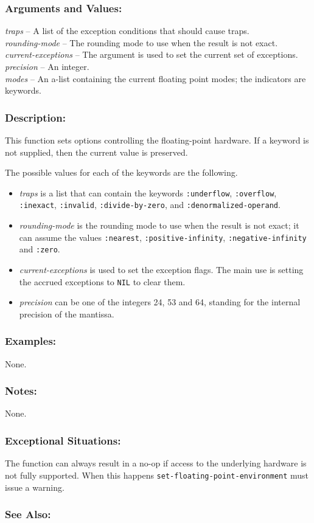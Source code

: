 \documentclass[10pt,fleqn]{article}
\newcommand{\code}[1]{\texttt{#1}}
\newcommand{\varname}[1]{\textit{#1}}
\newcommand{\DArgsNValues}{\subsubsection*{Arguments and Values:}}
\newcommand{\DDescription}{\subsubsection*{Description:}}
\newcommand{\DExamples}{\subsubsection*{Examples:}}
\newcommand{\DExceptional}{\subsubsection*{Exceptional Situations:}}
\newcommand{\DNotes}{\subsubsection*{Notes:}}
\newcommand{\DSeeAlso}{\subsubsection*{See Also:}}
\begin{document}
\DArgsNValues{}

\varname{traps} -- A list of the exception conditions that should cause
traps.\\
\varname{rounding-mode} -- The rounding mode to use when the result is
not exact.\\
\varname{current-exceptions} -- The argument is used to set the current
set of exceptions.\\
\varname{precision} -- An integer.\\
\varname{modes} -- An a-list containing the current floating
point modes; the indicators are keywords.

\DDescription{}

This function sets options controlling the floating-point
hardware. If a keyword is not supplied, then the current value is
preserved.

The possible values for each of the keywords are the
following.

\begin{itemize}
\item \varname{traps} is a list that can contain the keywords
  \code{:underflow}, \code{:overflow}, \code{:inexact}, \code{:invalid},
  \code{:divide-by-zero}, and \code{:denormalized-operand}.

\item \varname{rounding-mode} is the rounding mode to use when the result is
  not exact; it can assume the values \code{:nearest},
  \code{:positive-infinity}, \code{:negative-infinity} and
  \code{:zero}.

\item \varname{current-exceptions} is used to set the exception flags. The
  main use is setting the accrued exceptions to \code{NIL} to clear
  them.

\item \varname{precision} can be one of the integers 24, 53 and 64, standing for
  the internal precision of the mantissa.
\end{itemize}

\DExamples{}

None.


\DNotes{}

None.


\DExceptional{}

The function can always result in a no-op if access to the underlying
hardware is not fully supported.  When this happens
\code{set-floating-point-environment} must issue a warning.


\DSeeAlso{}
\end{document}
